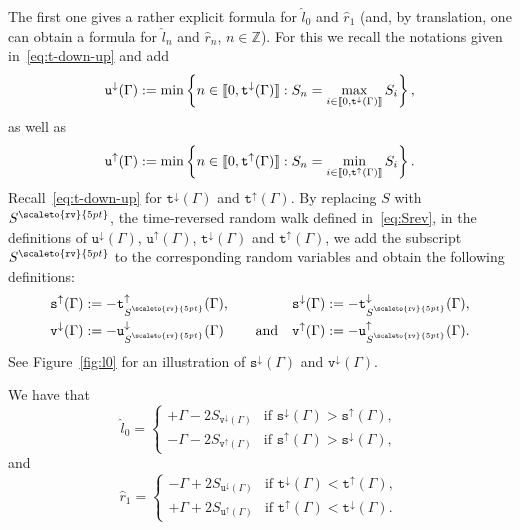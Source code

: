 \documentclass[10pt]{amsart}
\theoremstyle{definition}\newtheorem{defi}[theo]{Definition}\newtheorem{rema}[theo]{Remark}\newtheorem{exam}[theo]{Example}\newtheorem{exem}[theo]{Example}\newtheorem{nota}[theo]{Notation}
\newcommand{\bbZ}{\mathbb{Z}}
\newcommand{\gG}{\Gamma}
\renewcommand*\ss{\mathtt{u}}
\newcommand{\ttt}{\mathtt{t}}
\newcommand{\ttdown}{\ttt^\downarrow}
\newcommand{\ttup}{\ttt^\uparrow}
\newcommand{\tudown}{\ss^\downarrow}
\newcommand{\tuup}{\ss^\uparrow}
\newcommand{\ts}{\mathtt{s}}
\newcommand{\ttv}{\mathtt{v}}
\newcommand\mystrut{\rule{0pt}{6pt}}
\newcommand{\Srev}{S\mystrut^{\scaleto{\mathtt{rv}\mathstrut}{5pt}}}
\newcommand{\ls}{\widehat{l}}
\newcommand{\rs}{\widehat{r}}
\newcommand{\llbracket}{\mathopen{[\mkern -2.7mu[}}
\newcommand{\rrbracket}{\mathclose{]\mkern -2.7mu]}}
\newcommand{\lbra}{\llbracket}
\newcommand{\rbra}{\rrbracket}
\begin{document}
The first one gives a rather explicit formula for $\ls_0$ and $\rs_1$ (and, by translation, one can obtain a formula for $\ls_n$ and $\rs_n$, $n\in \bbZ$). For this we recall the notations given in~\eqref{eq:t-down-up} and add
\begin{equation}\label{eq:defudown}
\tudown(\gG):= \min\left\{ n \in \lbra 0, \ttt^\downarrow(\gG)\rbra: S_n= \max_{i \in \lbra 0, \ttt^\downarrow(\gG)\rbra} S_i\right\},
\end{equation}
as well as
\begin{equation}
\tuup(\gG):= \min\left\{ n \in \lbra 0, \ttt^\uparrow(\gG)\rbra: S_n= \min_{i \in \lbra 0, \ttt^\uparrow(\gG)\rbra} S_i\right\}.
\end{equation}
Recall~\eqref{eq:t-down-up} for $\ttt^\downarrow(\gG)$ and $\ttt^\uparrow(\gG)$. By replacing $S$ with $\Srev$, the time-reversed random walk defined in~\eqref{eq:Srev}, in the definitions of $\tudown(\gG)$, $\tuup(\gG)$, $\ttt^\downarrow(\gG)$ and $\ttt^\uparrow(\gG)$, we add the subscript $\Srev$ to the corresponding random variables and obtain the following definitions:
\begin{equation}\label{def-supdown}
\begin{aligned}
\ts^\uparrow (\gG)&:= -\ttup_{\Srev}(\gG),
\quad &
\ts^\downarrow (\gG) &:= -\ttdown_{\Srev}(\gG),
\\
\ttv^\downarrow (\gG)&:=-\tudown_{\Srev}(\gG) &\text{and}\quad
\ttv^\uparrow (\gG) &:=-\tuup_{\Srev}(\gG).
\end{aligned}
\end{equation}
See Figure~\ref{fig:l0} for an illustration of $\ts^\downarrow (\gG)$ and $\ttv^\downarrow (\gG)$.

\begin{prop}\label{th:explicit-hat}
We have that
\begin{equation}\label{eq:explicit-hat-l}
\widehat l_0 =
\begin{cases}
+\gG - 2 S_{\ttv^\downarrow (\gG)} & \text{if } \ts^\downarrow(\gG)> \ts^\uparrow(\gG),
\\
-\gG - 2 S_{\ttv^\uparrow (\gG)} & \text{if } \ts^\uparrow(\gG)> \ts^\downarrow(\gG),
\end{cases}
\end{equation}
and
\begin{equation}\label{eq:explicit-hat-r}
\rs_1=
\begin{cases}
-\Gamma+2 S_{\tudown(\gG)} & \text{if } \ttdown(\Gamma)<\ttup(\Gamma),\\
+\Gamma+2 S_{\tuup(\gG)} & \text{if } \ttup(\Gamma)<\ttdown(\Gamma).
\end{cases}
\end{equation}
\end{prop}
\end{document}
